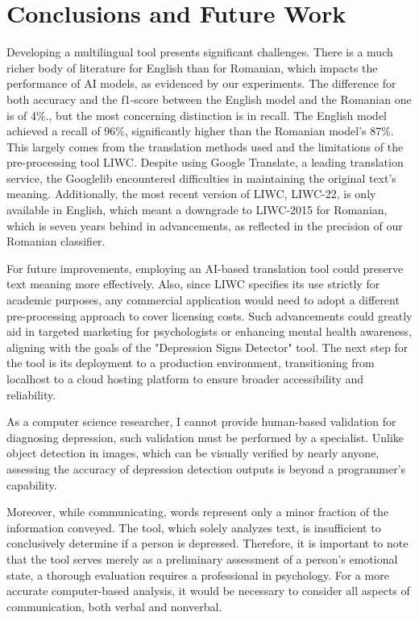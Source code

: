 \chapter{Conclusions and Future Work}
\label{conclusions}

\quad Developing a multilingual tool presents significant challenges. There is a much richer body of literature for English than for Romanian, which impacts the performance of AI models, as evidenced by our experiments. The difference for both accuracy and the f1-score between the English model and the Romanian one is of 4\%., but the most concerning distinction is in recall. The English model achieved a recall of 96\%, significantly higher than the Romanian model's 87\%. This largely comes from the translation methods used and the limitations of the pre-processing tool LIWC. Despite using Google Translate, a leading translation service, the Googlelib \cite{googletranslib} encountered difficulties in maintaining the original text's meaning. Additionally, the most recent version of LIWC, LIWC-22, is only available in English, which meant a downgrade to LIWC-2015 for Romanian, which is seven years behind in advancements, as reflected in the precision of our Romanian classifier.

For future improvements, employing an AI-based translation tool could preserve text meaning more effectively. Also, since LIWC \cite{boyd2022development} specifies its use strictly for academic purposes, any commercial application would need to adopt a different pre-processing approach to cover licensing costs. Such advancements could greatly aid in targeted marketing for psychologists or enhancing mental health awareness, aligning with the goals of the "Depression Signs Detector" tool. The next step for the tool is its deployment to a production environment, transitioning from localhost to a cloud hosting platform to ensure broader accessibility and reliability.

As a computer science researcher, I cannot provide human-based validation for diagnosing depression, such validation must be performed by a specialist. Unlike object detection in images, which can be visually verified by nearly anyone, assessing the accuracy of depression detection outputs is beyond a programmer’s capability.

Moreover, while communicating, words represent only a minor fraction of the information conveyed. The tool, which solely analyzes text, is insufficient to conclusively determine if a person is depressed. Therefore, it is important to note that the tool serves merely as a preliminary assessment of a person’s emotional state, a thorough evaluation requires a professional in psychology. For a more accurate computer-based analysis, it would be necessary to consider all aspects of communication, both verbal and nonverbal.

